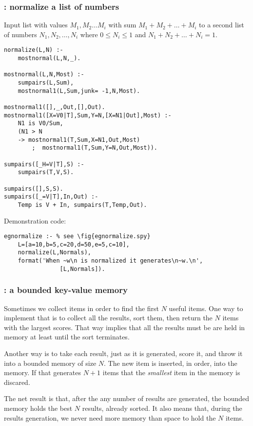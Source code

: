 \subsubsection{ : normalize a list of numbers
}
\label{sec:normalize/2}
Input list with values $M_1,M_2\ldots M_i$
with sum $M_1+M_2+\ldots + M_i$ to
a second list of numbers  $N_1,N_2,\ldots,N_i$
where $0\le N_i\le1$ and $N_1+N_2+\ldots+N_i=1$.
\begin{Verbatim}
normalize(L,N) :- 
    mostnormal(L,N,_).

mostnormal(L,N,Most) :-
    sumpairs(L,Sum), 
    mostnormal1(L,Sum,junk= -1,N,Most).

mostnormal1([],_,Out,[],Out).
mostnormal1([X=V0|T],Sum,Y=N,[X=N1|Out],Most) :-
    N1 is V0/Sum,
    (N1 > N
    -> mostnormal1(T,Sum,X=N1,Out,Most)
        ;  mostnormal1(T,Sum,Y=N,Out,Most)).

sumpairs([_H=V|T],S) :- 
    sumpairs(T,V,S).

sumpairs([],S,S).
sumpairs([_=V|T],In,Out) :- 
    Temp is V + In, sumpairs(T,Temp,Out).
\end{Verbatim}
Demonstration code: 
\begin{Verbatim}
egnormalize :- % see \fig{egnormalize.spy}
    L=[a=10,b=5,c=20,d=50,e=5,c=10],
    normalize(L,Normals),
    format('When ~w\n is normalized it generates\n~w.\n',
                [L,Normals]).
\end{Verbatim}
\subsubsection{: a bounded key-value memory
}

\label{sec:bounded/3}
Sometimes we collect items in order to find the
first $N$ useful items. One way to implement
that is to collect all the  results, sort them,
then return the $N$ items with the largest scores.
That way implies
that all the results must be are held in memory
at least until the sort terminates.

Another way is to take each result, just as it is
generated, score it,
and throw it into a bounded memory of size
$N$. The new item is inserted, in order, into the memory.
If that 
generates $N+1$ items that the {\em smallest} item in
the memory is discared.

The net result is that, after the any number of results are generated,
	the bounded memory holds the best $N$ results, already sorted.
It also means that, during the results generation, we never need more
memory than space to hold the $N$ items.

